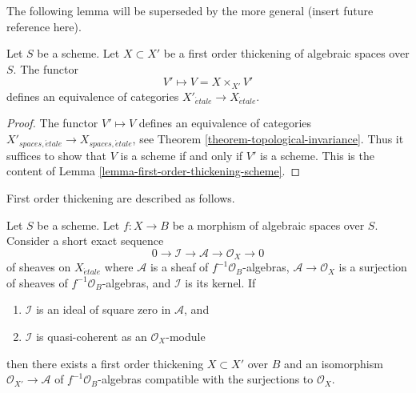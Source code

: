 \noindent
The following lemma will be superseded by the more general
(insert future reference here).

\begin{lemma}
\label{lemma-first-order-thickening-equivalence}
Let $S$ be a scheme. Let $X \subset X'$ be a first order thickening
of algebraic spaces over $S$. The functor
$$
V' \longmapsto V = X \times_{X'} V'
$$
defines an equivalence of categories
$X'_{\acute{e}tale} \to X_{\acute{e}tale}$.
\end{lemma}

\begin{proof}
The functor $V' \mapsto V$ defines an equivalence of categories
$X'_{spaces, \acute{e}tale} \to X_{spaces, \acute{e}tale}$, see
Theorem \ref{theorem-topological-invariance}.
Thus it suffices to show that $V$ is a scheme if and only if $V'$ is
a scheme. This is the content of
Lemma \ref{lemma-first-order-thickening-scheme}.
\end{proof}

\noindent
First order thickening are described as follows.

\begin{lemma}
\label{lemma-first-order-thickening}
Let $S$ be a scheme.
Let $f : X \to B$ be a morphism of algebraic spaces over $S$.
Consider a short exact sequence
$$
0 \to \mathcal{I} \to \mathcal{A} \to \mathcal{O}_X \to 0
$$
of sheaves on $X_{\acute{e}tale}$ where $\mathcal{A}$ is a sheaf of
$f^{-1}\mathcal{O}_B$-algebras, $\mathcal{A} \to \mathcal{O}_X$ is a surjection
of sheaves of $f^{-1}\mathcal{O}_B$-algebras, and $\mathcal{I}$ is its kernel.
If
\begin{enumerate}
\item $\mathcal{I}$ is an ideal of square zero in $\mathcal{A}$, and
\item $\mathcal{I}$ is quasi-coherent as an $\mathcal{O}_X$-module
\end{enumerate}
then there exists a first order thickening
$X \subset X'$ over $B$ and an isomorphism
$\mathcal{O}_{X'} \to \mathcal{A}$ of $f^{-1}\mathcal{O}_B$-algebras
compatible with the surjections to $\mathcal{O}_X$.
\end{lemma}

